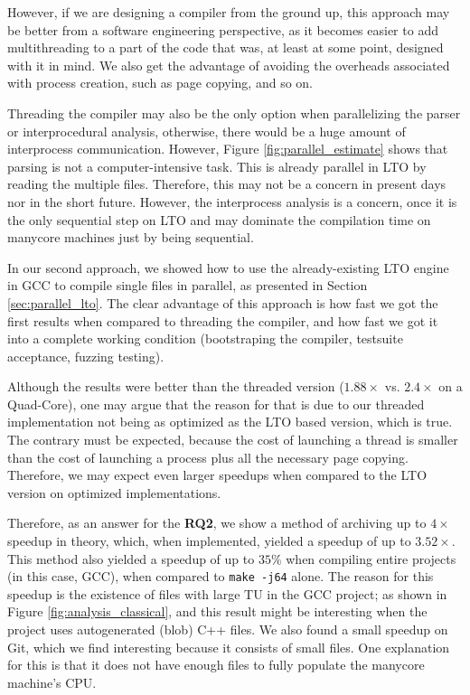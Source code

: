 However, if we are designing a compiler from the ground up, this approach may
be better from a software engineering perspective, as it becomes easier to add
multithreading to a part of the code that was, at least at some point, designed
with it in mind. We also get the advantage of avoiding the overheads
associated with process creation, such as page copying, and so on.

Threading the compiler may also be the only option when parallelizing the
parser or interprocedural analysis, otherwise, there would be a huge amount of
interprocess communication. However, Figure \ref{fig:parallel_estimate} shows
that parsing is not a computer-intensive task. This is already parallel in LTO
by reading the multiple files. Therefore, this may not be a concern in present
days nor in the short future. However, the interprocess analysis is a concern,
once it is the only sequential step on LTO and may dominate the compilation
time on manycore machines just by being sequential.

In our second approach, we showed how to use the already-existing LTO engine in
GCC to compile single files in parallel, as presented in Section
\ref{sec:parallel_lto}. The clear advantage of this approach is how fast we got
the first results when compared to threading the compiler, and how fast we got
it into a complete working condition (bootstraping the compiler, testsuite
acceptance, fuzzing testing).

Although the results were better than the threaded version ($1.88\times$ vs. $2.4\times$
on a Quad-Core),
one may argue that the reason for that is due to our threaded implementation
not being as optimized as the LTO based version, which is true. The
contrary must be expected, because the cost of launching a thread is smaller
than the cost of launching a process plus all the necessary page copying.
Therefore, we may expect even larger speedups when compared to the LTO version
on optimized implementations.

Therefore, as an answer for the \textbf{RQ2}, we show a method of archiving up
to $4\times$ speedup in theory, which, when implemented, yielded a speedup of up
to $3.52\times$. This method also yielded a speedup of up to $35\%$ when
compiling entire projects (in this case, GCC), when compared to \texttt{make
-j64} alone. The reason for this speedup is the existence of files with large
TU in the GCC project; as shown in Figure \ref{fig:analysis_classical}, and
this result might be interesting when the project uses autogenerated (blob) C++
files. We also found a small speedup on Git, which we find interesting because
it consists of small files. One explanation for this is that it does not have
enough files to fully populate the manycore machine's CPU.

